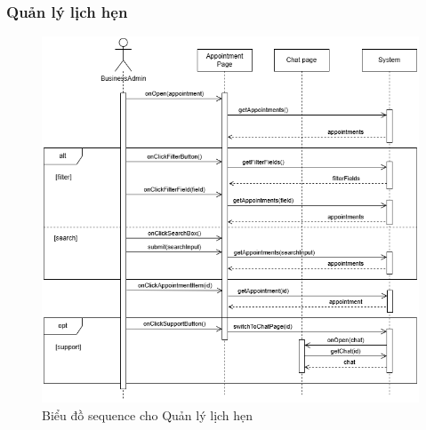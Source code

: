 \subsubsection{Quản lý lịch hẹn}
\begin{figure}[H]
    \centering
     \includegraphics[width=1\textwidth]{Dg_Sequence/AppointmentManagement.png}
    \vspace{0.5cm}
    \caption{Biểu đồ sequence cho Quản lý lịch hẹn}
    \label{fig:enter-label}
\end{figure}